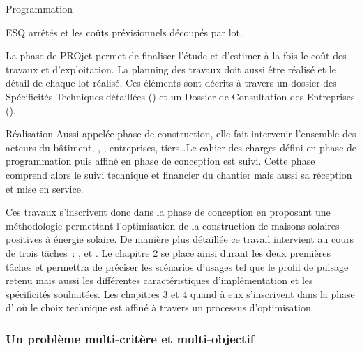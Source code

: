 \begin{blockdescription}{Programmation}
\begin{blockdescription}{ESQ}
                    arrêtés et les coûts prévisionnels découpés par lot.
              \item [\abr{PRO}] La phase de PROjet permet de finaliser l’étude et d’estimer
                     à la fois le coût des travaux et d’exploitation. La planning des travaux
                     doit aussi être réalisé et le détail de chaque lot réalisé. Ces éléments
                     sont décrits à travers un dossier des Spécificités Techniques
                     détaillées () et un Dossier de Consultation des Entreprises ().
          \end{blockdescription}
    \item[Réalisation] Aussi appelée phase de construction, elle fait intervenir l’ensemble des acteurs
          du bâtiment, , , entreprises, tiers\dots Le cahier des charges défini
          en phase de programmation puis affiné en phase de conception est suivi. Cette
          phase comprend alors le suivi technique et financier du chantier mais aussi sa
          réception et mise en service.
\end{blockdescription}

Ces travaux s’inscrivent donc dans la phase de conception en proposant une méthodologie
permettant l’optimisation de la construction de maisons solaires positives à énergie solaire.
De manière plus détaillée ce travail intervient au cours de trois tâches~: , 
et . Le chapitre $2$ se place ainsi durant les deux premières tâches
et permettra de préciser les scénarios d’usages tel que le profil de
puisage retenu mais aussi les différentes caractéristiques d’implémentation et les
spécificités souhaitées. Les chapitres $3$ et $4$ quand à eux s’inscrivent dans la phase
d’ où le choix technique est affiné à travers un processus d’optimisation.



\subsubsection{Un problème multi-critère et multi-objectif} %
\label{ssub:un_probleme_multi_critere_et_multi_objectif}

